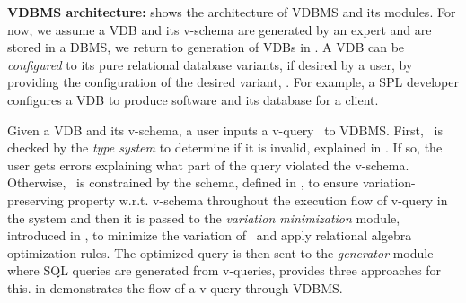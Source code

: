 \textbf{VDBMS architecture:}
 shows the architecture of VDBMS and its modules.
For now, we assume a VDB and its v-schema are generated by an 
expert and are stored in a DBMS, we return to generation of VDBs in 
. A VDB can be \emph{configured} to its pure relational 
database variants, if desired by a user, by providing the configuration
of the desired variant, .
For example, a SPL developer configures a VDB to produce 
software and its database for a client.

Given a VDB and its v-schema, a user inputs a v-query \vQ\ to VDBMS.
%
First, \vQ\ is checked by the \emph{type system} to determine if it is invalid, explained in 
. 
If so, the user gets errors explaining what part of the 
query violated the v-schema.
Otherwise, 
\vQ\ is constrained by the schema,
defined in ,
to ensure variation-preserving property w.r.t. v-schema throughout the execution flow of v-query 
in the system and then
%
it is passed to the \emph{variation minimization} module, introduced in 
, to minimize the variation of \vQ\ and apply
relational algebra optimization rules. 
%
The optimized query is then sent to the \emph{generator} module where
SQL queries are generated from v-queries,  provides three
approaches for this.
 in  demonstrates the flow of a v-query through
VDBMS.

